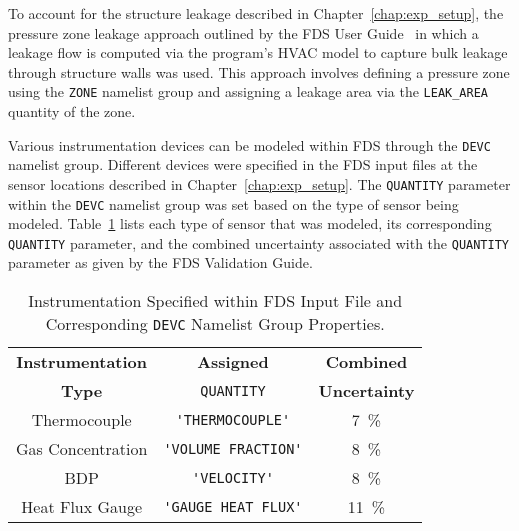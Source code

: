 To account for the structure leakage described in Chapter~\ref{chap:exp_setup}, the pressure zone leakage approach outlined by the FDS User Guide~\cite{FDS_Users_Guide} in which a leakage flow is computed via the program's HVAC model to capture bulk leakage through structure walls was used. This approach involves defining a pressure zone using the \verb|ZONE| namelist group and assigning a leakage area via the \verb|LEAK_AREA| quantity of the zone.

Various instrumentation devices can be modeled within FDS through the \verb|DEVC| namelist group. Different devices were specified in the FDS input files at the sensor locations described in Chapter~\ref{chap:exp_setup}. The \verb|QUANTITY| parameter within the \verb|DEVC| namelist group was set based on the type of sensor being modeled. Table~\ref{table:FDS_sensor_info} lists each type of sensor that was modeled, its corresponding \verb|QUANTITY| parameter, and the combined uncertainty associated with the \verb|QUANTITY| parameter as given by the FDS Validation Guide.  
\begin{table}[!ht]
\cprotect\caption{Instrumentation Specified within FDS Input File and Corresponding \verb|DEVC| Namelist Group Properties.}
\begin{center}
\begin{tabular}{ccc}
\toprule
\textbf{Instrumentation} & \textbf{Assigned}           & \textbf{Combined}       \\
\textbf{Type}                     & \verb|QUANTITY|             & \textbf{Uncertainty}        \\
\midrule
Thermocouple            & \verb|'THERMOCOUPLE'|       &     7~\%     \\
Gas Concentration       & \verb|'VOLUME FRACTION'|    &     8~\%     \\
BDP                     & \verb|'VELOCITY'|           &     8~\%     \\
Heat Flux Gauge         & \verb|'GAUGE HEAT FLUX'|    &     11~\%     \\
\bottomrule
\end{tabular}
\end{center}
\label{table:FDS_sensor_info}
\end{table}
\FloatBarrier

